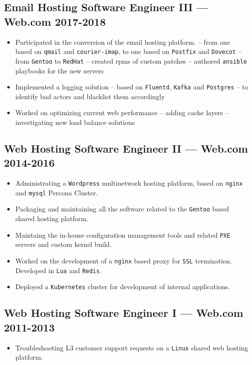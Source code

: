 \documentclass[11pt]{article}
\begin{document}
\subsection{Email Hosting Software Engineer III --- Web.com \hfill 2017-2018}
\begin{itemize}
  \setlength{\parskip}{0pt}
  \setlength{\itemsep}{0pt plus 1pt}
\item Participated in the conversion of the email hosting platform.
  \subitem -- from one based on \texttt{qmail} and \texttt{courier-imap}, to one based on \texttt{Postfix} and \texttt{Dovecot}
  \subitem -- from \texttt{Gentoo} to \texttt{RedHat}
  \subitem -- created rpms of custom patches
  \subitem -- authored \texttt{ansible} playbooks for the new servers
\item Implemented a logging solution
  \subitem -- based on \texttt{Fluentd}, \texttt{Kafka} and \texttt{Postgres}
  \subitem -- to identify bad actors and blacklist them accordingly
\item Worked on optimizing current web performance
  \subitem -- adding cache layers
  \subitem -- investigating new load balance solutions
\end{itemize}

\subsection{Web Hosting Software Engineer II --- Web.com \hfill 2014-2016}
\begin{itemize}
\item Administrating a \texttt{Wordpress} multinetwork hosting platform, based on \texttt{nginx} and \texttt{mysql} Percona Cluster.
\item Packaging and maintaining all the software related to the \texttt{Gentoo} based shared hosting platform.
\item Maintaing the in-house configuration management tools and related \texttt{PXE} servers and custom kernel build.
\item Worked on the development of a \texttt{nginx} based proxy for \texttt{SSL} termination. Developed in \texttt{Lua} and \texttt{Redis}.
\item Deployed a \texttt{Kubernetes} cluster for development of internal applications.
\end{itemize}

\subsection{Web Hosting Software Engineer I --- Web.com \hfill 2011-2013}
\begin{itemize}
\item Troubleshooting L3 customer support requests on a \texttt{Linux} shared web hosting platform.
\end{itemize}
\end{document}
